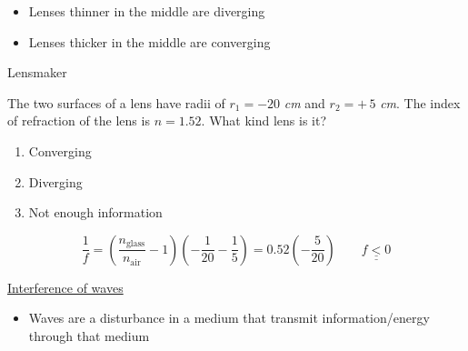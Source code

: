 \documentclass[11pt]{article}
\newcommand{\lensDV}[1][]{\draw[thick,#1] (-0.3,0.65) to[bend left=35] (-0.3,-0.65) -- (0.3,-0.65) to[bend left=35] (0.3,0.65) -- cycle;}
\begin{document}
\begin{itemize}[label=--]
  \item Lenses thinner in the middle are diverging
  \item Lenses thicker in the middle are converging
\end{itemize}

\newpage
{ Lensmaker

The two surfaces of a lens have radii of $r_1 = -20$ \emph{cm} and
$r_2 = +\,5$ \emph{cm}. %
The index of refraction of the lens is $n = 1.52$. What kind lens is it?

\begin{enumerate}[label=\Alph*)]
  \item Converging
  \item Diverging \ \checkmark
  \item Not enough information
\end{enumerate}
}

\[
  \frac1f = \left(\frac{n_{\text{glass}}}{n_{\text{air}}} - 1\right)\left(-\frac{1}{20} - \frac15\right)
  = 0.52\left(-\frac{5}{20}\right)
  \qquad \underline{\underline{f < 0}}
\]

\begin{center}
\end{center}

\newpage
{\large \underline{Interference of waves}}

\begin{itemize}[label=--]
  \item Waves are a disturbance in a medium that transmit information/energy through that medium
\end{itemize}

\begin{center}
\end{center}
\end{document}
